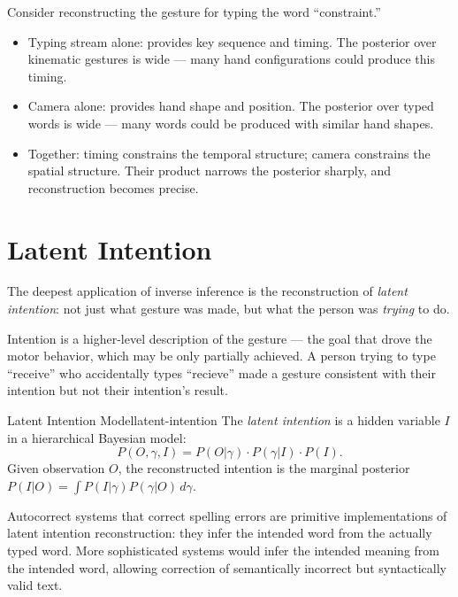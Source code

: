 \begin{example}
  Consider reconstructing the gesture for typing the word ``constraint.''
  \begin{itemize}
    \item Typing stream alone: provides key sequence and timing. The
          posterior over kinematic gestures is wide — many hand
          configurations could produce this timing.
    \item Camera alone: provides hand shape and position. The posterior
          over typed words is wide — many words could be produced with
          similar hand shapes.
    \item Together: timing constrains the temporal structure; camera
          constrains the spatial structure. Their product narrows
          the posterior sharply, and reconstruction becomes precise.
  \end{itemize}
\end{example}

\section{Latent Intention}

The deepest application of inverse inference is the reconstruction of
\emph{latent intention}: not just what gesture was made, but what the
person was \emph{trying} to do.

Intention is a higher-level description of the gesture — the goal that
drove the motor behavior, which may be only partially achieved. A person
trying to type ``receive'' who accidentally types ``recieve'' made a
gesture consistent with their intention but not their intention's result.

\begin{definition}{Latent Intention Model}{latent-intention}
  The \emph{latent intention} is a hidden variable $I$ in a hierarchical
  Bayesian model:
  \[
    P(O, \gamma, I) = P(O | \gamma) \cdot P(\gamma | I) \cdot P(I).
  \]
  Given observation $O$, the reconstructed intention is the marginal
  posterior $P(I | O) = \int P(I | \gamma) P(\gamma | O)\,d\gamma$.
\end{definition}

Autocorrect systems that correct spelling errors are primitive
implementations of latent intention reconstruction: they infer the
intended word from the actually typed word. More sophisticated systems
would infer the intended meaning from the intended word, allowing
correction of semantically incorrect but syntactically valid text.

